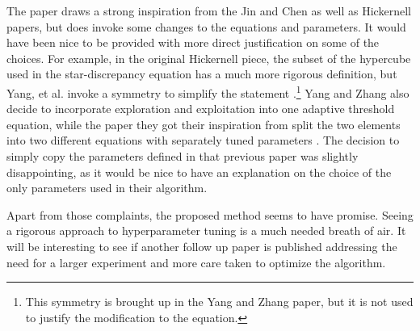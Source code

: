 \documentclass[twoside,11pt]{article}
\begin{document}
The paper draws a strong inspiration from the Jin and Chen as well as Hickernell papers, but does invoke some changes to the equations and parameters. It would have been nice to be provided with more direct justification on some of the choices. For example, in the original Hickernell piece, the subset of the hypercube used in the star-discrepancy equation has a much more rigorous definition, but Yang, et al. invoke a symmetry to simplify the statement \citep{hickernell_1998}.\footnote{This symmetry is brought up in the Yang and Zhang paper, but it is not used to justify the modification to the equation.} Yang and Zhang also decide to incorporate exploration and exploitation into one adaptive threshold equation, while the paper they got their inspiration from split the two elements into two different equations with separately tuned parameters \citep{jin_chen_sudjianto_2005}. The decision to simply copy the parameters defined in that previous paper was slightly disappointing, as it would be nice to have an explanation on the choice of the only parameters used in their algorithm.

Apart from those complaints, the proposed method seems to have promise. Seeing a rigorous approach to hyperparameter tuning is a much needed breath of air. It will be interesting to see if another follow up paper is published addressing the need for a larger experiment and more care taken to optimize the algorithm.


\vskip 0.2in

\end{document}
